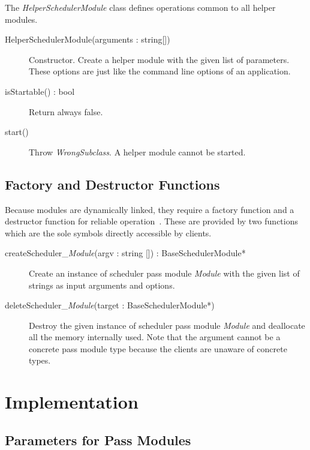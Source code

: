 \documentclass[a4paper,twoside]{tce}
\begin{document}
The \emph{HelperSchedulerModule} class defines operations common to all
helper modules.

\begin{description}

\item[HelperSchedulerModule(arguments : string{[]})]%
  Constructor. Create a helper module with the given list of parameters.
  These options are just like the command line options of an application.

\item[isStartable() : bool]
  Return always false.

\item[start()]
  Throw \emph{WrongSubclass}. A helper module cannot be started.

\end{description}

\subsection{Factory and Destructor Functions}

Because modules are dynamically linked, they require a factory function and
a destructor function for reliable operation~\cite{James00}. These are
provided by two functions which are the sole symbols directly accessible by
clients.

\begin{description}
\item[createScheduler\_\emph{Module}(argv : string {[]})
  : BaseSchedulerModule*]
  Create an instance of scheduler pass module \emph{Module} with the given
  list of strings as input arguments and options.

\item[deleteScheduler\_\emph{Module}(target : BaseSchedulerModule*)]
  Destroy the given instance of scheduler pass module \emph{Module} and
  deallocate all the memory internally used. Note that the argument cannot
  be a concrete pass module type because the clients are unaware of concrete
  types.
\end{description}

\section{Implementation}

\subsection{Parameters for Pass Modules}
\end{document}

